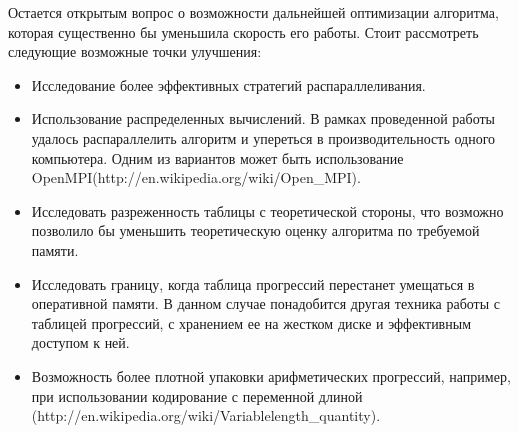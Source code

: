 \documentclass[14pt]{article}
\begin{document}
Остается открытым вопрос о возможности дальнейшей оптимизации алгоритма, которая существенно бы уменьшила скорость его работы. Стоит рассмотреть следующие возможные точки улучшения:
\begin{itemize}
\item Исследование более эффективных стратегий распараллеливания.
\item Использование распределенных вычислений. В рамках проведенной работы удалось распараллелить алгоритм и упереться в производительность одного компьютера. Одним из вариантов может быть использование OpenMPI(http://en.wikipedia.org/wiki/Open\_MPI).
\item Исследовать разреженность таблицы с теоретической стороны, что возможно позволило бы уменьшить теоретическую оценку алгоритма по требуемой памяти.
\item Исследовать границу, когда таблица прогрессий перестанет умещаться в оперативной памяти. В данном случае понадобится другая техника работы с таблицей прогрессий, с хранением ее на жестком диске и эффективным доступом к ней.
\item Возможность более плотной упаковки арифметических прогрессий, например, при использовании кодирование с переменной длиной (http://en.wikipedia.org/wiki/Variable\-length\_quantity).
\end{itemize} 
\end{document}
